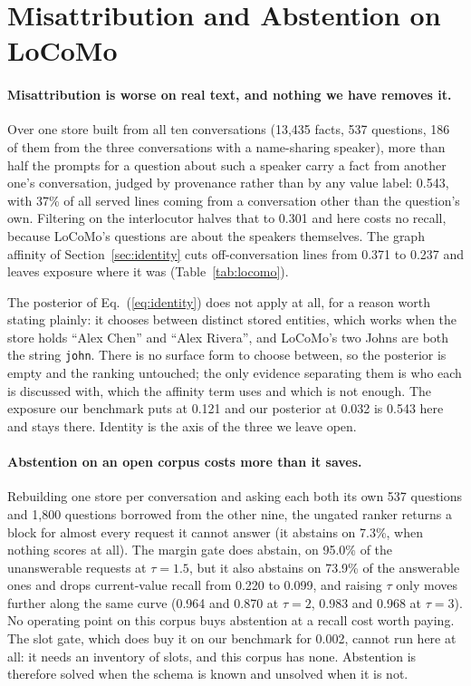 \documentclass{article} %
\begin{document}
\section{Misattribution and Abstention on LoCoMo}
\label{app:locomo}

\paragraph{Misattribution is worse on real text, and nothing we have removes it.} Over one store built from all ten conversations (13{,}435 facts, 537 questions, 186 of them from the three conversations with a name-sharing speaker), more than half the prompts for a question about such a speaker carry a fact from another one's conversation, judged by provenance rather than by any value label: 0.543, with 37\% of all served lines coming from a conversation other than the question's own. Filtering on the interlocutor halves that to 0.301 and here costs no recall, because LoCoMo's questions are about the speakers themselves. The graph affinity of Section~\ref{sec:identity} cuts off-conversation lines from 0.371 to 0.237 and leaves exposure where it was (Table~\ref{tab:locomo}).

The posterior of Eq.~(\ref{eq:identity}) does not apply at all, for a reason worth stating plainly: it chooses between distinct stored entities, which works when the store holds ``Alex Chen'' and ``Alex Rivera'', and LoCoMo's two Johns are both the string \texttt{john}. There is no surface form to choose between, so the posterior is empty and the ranking untouched; the only evidence separating them is who each is discussed with, which the affinity term uses and which is not enough. The exposure our benchmark puts at 0.121 and our posterior at 0.032 is 0.543 here and stays there. Identity is the axis of the three we leave open.

\paragraph{Abstention on an open corpus costs more than it saves.} Rebuilding one store per conversation and asking each both its own 537 questions and 1{,}800 questions borrowed from the other nine, the ungated ranker returns a block for almost every request it cannot answer (it abstains on 7.3\%, when nothing scores at all). The margin gate does abstain, on 95.0\% of the unanswerable requests at $\tau=1.5$, but it also abstains on 73.9\% of the answerable ones and drops current-value recall from 0.220 to 0.099, and raising $\tau$ only moves further along the same curve (0.964 and 0.870 at $\tau=2$, 0.983 and 0.968 at $\tau=3$). No operating point on this corpus buys abstention at a recall cost worth paying. The slot gate, which does buy it on our benchmark for 0.002, cannot run here at all: it needs an inventory of slots, and this corpus has none. Abstention is therefore solved when the schema is known and unsolved when it is not.
\end{document}
